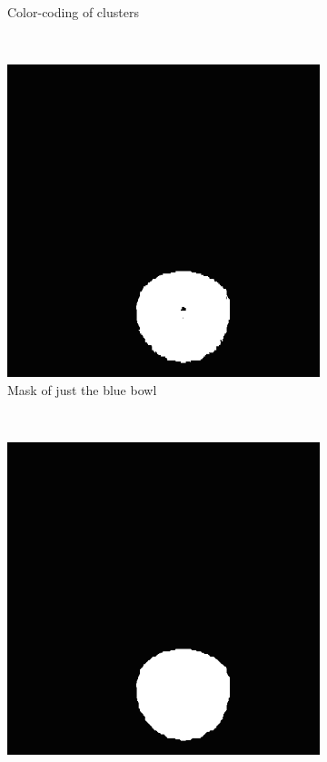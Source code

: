 \documentclass[10pt,twocolumn,letterpaper]{article}
\begin{document}
\begin{figure}[ht]
\begin{subfigure}[t]{0.2\textwidth}
        \caption{Color-coding of clusters}
        \label{bowl-kmeans-clusterids}
    \end{subfigure}
    ~\\
    \begin{subfigure}[t]{0.2\textwidth}
        \centering
        \includegraphics[width=\textwidth]{silhouette.png}
        \caption{Mask of just the blue bowl}
        \label{bowl-kmeans-silhouette}
    \end{subfigure}
    ~
    \begin{subfigure}[t]{0.2\textwidth}
        \centering
        \includegraphics[width=\textwidth]{silhouette_infill.png}

\end{subfigure}
\end{figure}
\end{document}
